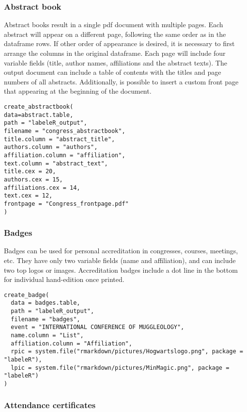 \documentclass[draft,linenumbers]{agujournal2018}
\begin{document}
\subsubsection{Abstract book}

Abstract books result in a single pdf document with multiple pages. Each
abstract will appear on a different page, following the same order as in
the dataframe rows. If other order of appearance is desired, it is
necessary to first arrange the columns in the original dataframe. Each
page will include four variable fields (title, author names,
affiliations and the abstract texts). The output document can include a
table of contents with the titles and page numbers of all abstracts.
Additionally, is possible to insert a custom front page that appearing
at the beginning of the document.

\begin{verbatim}
create_abstractbook(
data=abstract.table,
path = "labeleR_output",
filename = "congress_abstractbook",
title.column = "abstract_title",
authors.column = "authors",
affiliation.column = "affiliation",
text.column = "abstract_text",
title.cex = 20,
authors.cex = 15,
affiliations.cex = 14,
text.cex = 12,
frontpage = "Congress_frontpage.pdf"
)
\end{verbatim}

\subsubsection{Badges}

Badges can be used for personal accreditation in congresses, courses,
meetings, etc. They have only two variable fields (name and
affiliation), and can include two top logos or images. Accreditation
badges include a dot line in the bottom for individual hand-edition once
printed.

\begin{verbatim}
create_badge(
  data = badges.table,
  path = "labeleR_output",
  filename = "badges",
  event = "INTERNATIONAL CONFERENCE OF MUGGLEOLOGY",
  name.column = "List",
  affiliation.column = "Affiliation",
  rpic = system.file("rmarkdown/pictures/Hogwartslogo.png", package = "labeleR"),
  lpic = system.file("rmarkdown/pictures/MinMagic.png", package = "labeleR")
)
\end{verbatim}

\subsubsection{Attendance certificates}
\end{document}
